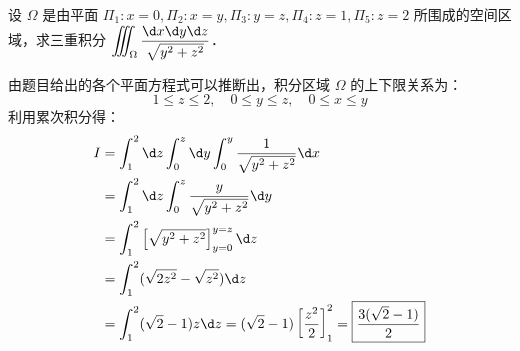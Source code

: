\documentclass[12pt, a4paper, oneside, UTF8]{ctexbook}
\begin{document}
\begin{exercise}
    设 $\Omega$ 是由平面 $\Pi_1:x=0, \Pi_2:x=y, \Pi_3:y=z, \Pi_4:z=1, \Pi_5:z=2$ 所围成的空间区域，求三重积分 $\displaystyle\iiint_\Omega \frac{\d x\d y\d z}{\sqrt{y^2+z^2}}$．
\end{exercise}
\begin{solution}
由题目给出的各个平面方程式可以推断出，积分区域 $\Omega$ 的上下限关系为：
\[ 1 \le z \le 2, \quad 0 \le y \le z, \quad 0 \le x \le y \]
利用累次积分得：
\begin{align*}
    I &= \int_1^2 \d z \int_0^z \d y \int_0^y \frac{1}{\sqrt{y^2+z^2}} \d x \\
      &= \int_1^2 \d z \int_0^z \frac{y}{\sqrt{y^2+z^2}} \d y \\
      &= \int_1^2 \left[ \sqrt{y^2+z^2} \right]_{y=0}^{y=z} \d z \\
      &= \int_1^2 (\sqrt{2z^2} - \sqrt{z^2}) \d z \\
      &= \int_1^2 (\sqrt{2}-1)z \d z = (\sqrt{2}-1) \left[ \frac{z^2}{2} \right]_1^2 = \boxed{\frac{3(\sqrt{2}-1)}{2}}
\end{align*}
\end{solution}
\end{document}
